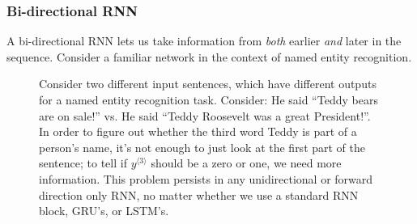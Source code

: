 \documentclass[12pt]{article}
\begin{document}
\subsubsection{Bi-directional RNN} A bi-directional RNN lets us take information from \emph{both} earlier \emph{and} later in the sequence. Consider a familiar network in the context of named entity recognition.

\begin{figure}[h]
  \centering
  \caption{\footnotesize Consider two different input sentences, which have     different outputs for a named entity recognition task. Consider:
    He said ``Teddy bears are on sale!'' vs. He said ``Teddy Roosevelt was a great President!''. In order to figure out whether the third word Teddy is part of a person's name, it's not enough to just look at the first part of the sentence; to tell if $y^{\langle 3 \rangle}$ should be a zero or one, we need more information. This problem persists in any unidirectional or forward direction only RNN, no matter whether we use a standard RNN block, GRU's, or LSTM's.}
\end{figure}
\end{document}
